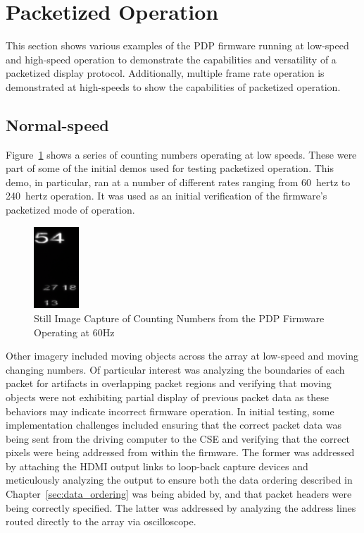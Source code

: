 \section{Packetized Operation}
        This section shows various examples of the PDP firmware running at low-speed and high-speed operation to demonstrate the capabilities and versatility of a packetized display protocol. Additionally, multiple frame rate operation is demonstrated at high-speeds to show the capabilities of packetized operation.

    \subsection{Normal-speed}
        Figure~\ref{fig:low_speed_numbers} shows a series of counting numbers operating at low speeds. These were part of some of the initial demos used for testing packetized operation. This demo, in particular, ran at a number of different rates ranging from \mbox{60 hertz} to \mbox{240 hertz} operation. It was used as an initial verification of the firmware's packetized mode of operation.

        \begin{figure}[t]
            \centering
            \includegraphics[width=0.15\textwidth]{fig/low_speed_numbers.png}
            \caption{Still Image Capture of Counting Numbers from the PDP Firmware Operating at 60Hz}
            \label{fig:low_speed_numbers}
        \end{figure}

        Other imagery included moving objects across the array at low-speed and moving changing numbers. Of particular interest was analyzing the boundaries of each packet for artifacts in overlapping packet regions and verifying that moving objects were not exhibiting partial display of previous packet data as these behaviors may indicate incorrect firmware operation. In initial testing, some implementation challenges included ensuring that the correct packet data was being sent from the driving computer to the CSE and verifying that the correct pixels were being addressed from within the firmware. The former was addressed by attaching the HDMI output links to loop-back capture devices and meticulously analyzing the output to ensure both the data ordering described in Chapter~\ref{sec:data_ordering} was being abided by, and that packet headers were being correctly specified. The latter was addressed by analyzing the address lines routed directly to the array via oscilloscope.

